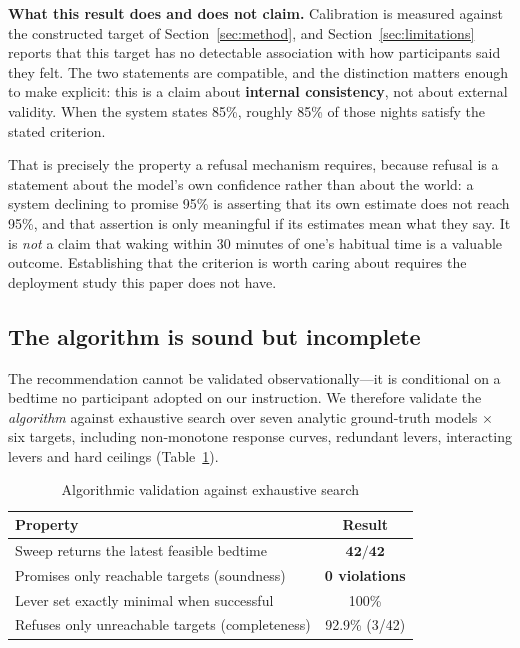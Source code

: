 \documentclass[conference]{IEEEtran}
\begin{document}
\textbf{What this result does and does not claim.} Calibration is measured
against the constructed target of Section~\ref{sec:method}, and
Section~\ref{sec:limitations} reports that this target has no detectable
association with how participants said they felt. The two statements are
compatible, and the distinction matters enough to make explicit: this is a claim
about \textbf{internal consistency}, not about external validity. When the
system states 85\%, roughly 85\% of those nights satisfy the stated criterion.

That is precisely the property a refusal mechanism requires, because refusal is
a statement about the model's own confidence rather than about the world: a
system declining to promise 95\% is asserting that its own estimate does not
reach 95\%, and that assertion is only meaningful if its estimates mean what
they say. It is \emph{not} a claim that waking within 30 minutes of one's
habitual time is a valuable outcome. Establishing that the criterion is worth
caring about requires the deployment study this paper does not have.

\subsection{The algorithm is sound but incomplete}
\label{sec:sound}

The recommendation cannot be validated observationally---it is conditional on a
bedtime no participant adopted on our instruction. We therefore validate the
\emph{algorithm} against exhaustive search over seven analytic ground-truth
models $\times$ six targets, including non-monotone response curves, redundant
levers, interacting levers and hard ceilings (Table~\ref{tab:sound}).

\begin{table}[t]
\caption{Algorithmic validation against exhaustive search}
\label{tab:sound}
\centering
\small
\begin{tabular}{lc}
\toprule
Property & Result \\
\midrule
Sweep returns the latest feasible bedtime & $\mathbf{42/42}$ \\
Promises only reachable targets (soundness) & \textbf{0 violations} \\
Lever set exactly minimal when successful & 100\% \\
Refuses only unreachable targets (completeness) & 92.9\% (3/42) \\
\bottomrule
\end{tabular}
\end{table}
\end{document}
